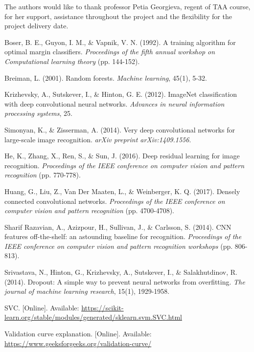 \documentclass[conference]{IEEEtran}
\begin{document}
The authors would like to thank professor Petia Georgieva, regent of TAA course, for her support, assistance throughout the project and the flexibility for the project delivery date.


\begin{thebibliography}{10}

Boser, B. E., Guyon, I. M., \& Vapnik, V. N. (1992).
A training algorithm for optimal margin classifiers.
\textit{Proceedings of the fifth annual workshop on Computational learning theory} (pp. 144-152).

Breiman, L. (2001).
Random forests.
\textit{Machine learning}, 45(1), 5-32.

Krizhevsky, A., Sutskever, I., \& Hinton, G. E. (2012).
ImageNet classification with deep convolutional neural networks.
\textit{Advances in neural information processing systems}, 25.

Simonyan, K., \& Zisserman, A. (2014).
Very deep convolutional networks for large-scale image recognition.
\textit{arXiv preprint arXiv:1409.1556}.

He, K., Zhang, X., Ren, S., \& Sun, J. (2016).
Deep residual learning for image recognition.
\textit{Proceedings of the IEEE conference on computer vision and pattern recognition} (pp. 770-778).

Huang, G., Liu, Z., Van Der Maaten, L., \& Weinberger, K. Q. (2017).
Densely connected convolutional networks.
\textit{Proceedings of the IEEE conference on computer vision and pattern recognition} (pp. 4700-4708).

Sharif Razavian, A., Azizpour, H., Sullivan, J., \& Carlsson, S. (2014).
CNN features off-the-shelf: an astounding baseline for recognition.
\textit{Proceedings of the IEEE conference on computer vision and pattern recognition workshops} (pp. 806-813).

Srivastava, N., Hinton, G., Krizhevsky, A., Sutskever, I., \& Salakhutdinov, R. (2014).
Dropout: A simple way to prevent neural networks from overfitting.
\textit{The journal of machine learning research}, 15(1), 1929-1958.

SVC. [Online]. Available: \url{https://scikit-learn.org/stable/modules/generated/sklearn.svm.SVC.html}

Validation curve explanation. [Online]. Available: \url{https://www.geeksforgeeks.org/validation-curve/}


\end{thebibliography}
\end{document}
